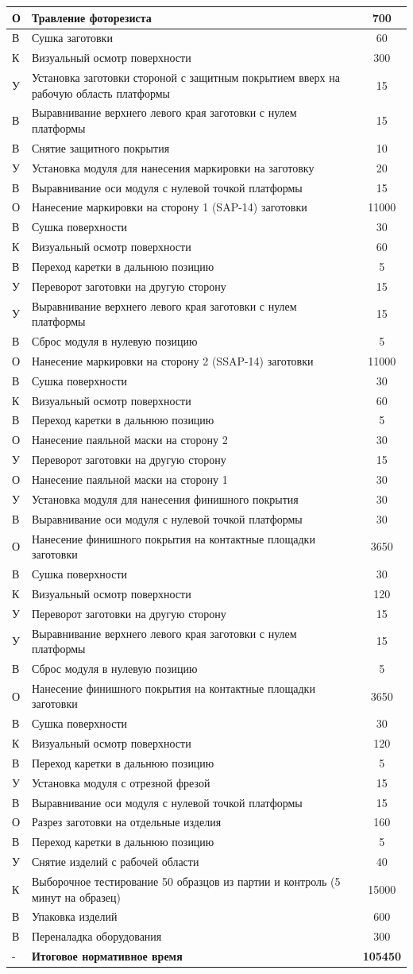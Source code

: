 \begin{longtable}[c]{|p{1cm}|p{11cm}|c|}
		О & Травление фоторезиста & 700 \tabularnewline \hline
		В & Сушка заготовки & 60 \tabularnewline \hline
		К & Визуальный осмотр поверхности & 300 \tabularnewline \hline
		У & Установка заготовки стороной с защитным покрытием вверх на рабочую область платформы & 15 \tabularnewline \hline
		В & Выравнивание верхнего левого края заготовки с нулем платформы & 15 \tabularnewline \hline
		В & Снятие защитного покрытия & 10 \tabularnewline \hline
		У & Установка модуля для нанесения маркировки на заготовку & 20 \tabularnewline \hline
		В & Выравнивание оси модуля с нулевой точкой платформы & 15 \tabularnewline \hline
		О & Нанесение маркировки на сторону 1 (SAP-14) заготовки & 11000 \tabularnewline \hline
		В & Сушка поверхности & 30 \tabularnewline \hline
		К & Визуальный осмотр поверхности & 60 \tabularnewline \hline
		В & Переход каретки в дальнюю позицию & 5 \tabularnewline \hline
		У & Переворот заготовки на другую сторону & 15 \tabularnewline \hline
		У & Выравнивание верхнего левого края заготовки с нулем платформы & 15 \tabularnewline \hline
		В & Сброс модуля в нулевую позицию & 5 \tabularnewline \hline
		О & Нанесение маркировки на сторону 2 (SSAP-14) заготовки & 11000 \tabularnewline \hline
		В & Сушка поверхности & 30 \tabularnewline \hline
		К & Визуальный осмотр поверхности & 60 \tabularnewline \hline
		В & Переход каретки в дальнюю позицию & 5 \tabularnewline \hline
		О & Нанесение паяльной маски на сторону 2 & 30 \tabularnewline \hline
		У & Переворот заготовки на другую сторону & 15 \tabularnewline \hline
		О & Нанесение паяльной маски на сторону 1 & 30 \tabularnewline \hline
		У & Установка модуля для нанесения финишного покрытия & 30 \tabularnewline \hline
		В & Выравнивание оси модуля с нулевой точкой платформы & 30 \tabularnewline \hline
		О & Нанесение финишного покрытия на контактные площадки заготовки & 3650 \tabularnewline \hline
		В & Сушка поверхности & 30 \tabularnewline \hline
		К & Визуальный осмотр поверхности & 120 \tabularnewline \hline
		У & Переворот заготовки на другую сторону & 15 \tabularnewline \hline
		У & Выравнивание верхнего левого края заготовки с нулем платформы & 15 \tabularnewline \hline
		В & Сброс модуля в нулевую позицию & 5 \tabularnewline \hline
		О & Нанесение финишного покрытия на контактные площадки заготовки & 3650 \tabularnewline \hline
		В & Сушка поверхности & 30 \tabularnewline \hline
		К & Визуальный осмотр поверхности & 120 \tabularnewline \hline
		В & Переход каретки в дальнюю позицию & 5 \tabularnewline \hline
		У & Установка модуля с отрезной фрезой & 15 \tabularnewline \hline
		В & Выравнивание оси модуля с нулевой точкой платформы & 15 \tabularnewline \hline
		О & Разрез заготовки на отдельные изделия & 160 \tabularnewline \hline
		В & Переход каретки в дальнюю позицию & 5 \tabularnewline \hline
		У & Снятие изделий с рабочей области & 40 \tabularnewline \hline
		К & Выборочное тестирование 50 образцов из партии и контроль (5 минут на образец) & 15000 \tabularnewline \hline
		В & Упаковка изделий & 600 \tabularnewline \hline
		В & Переналадка оборудования & 300 \tabularnewline \hline
		- & \textbf{Итоговое нормативное время} & \textbf{105450} \tabularnewline \hline
	\end{longtable}
\endgroup

